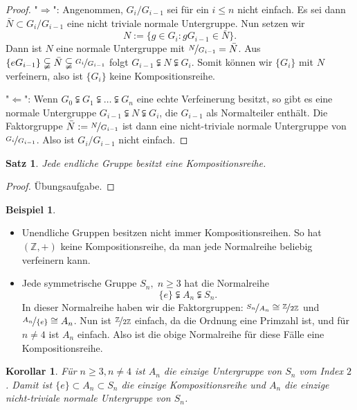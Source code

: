 \documentclass[12pt]{scrartcl} %
\newtheorem{thm}{Satz}
\newtheorem{kor}{Korollar}
\theoremstyle{definition}
\newtheorem{ex}{Beispiel}
\theoremstyle{remark}
\begin{document}
\begin{proof}
	"$\Rightarrow$": Angenommen, $G_i/G_{i-1}$ sei für ein $i\leq n$ nicht einfach. Es sei dann $\bar{N}\subset G_i/G_{i-1}$ eine nicht triviale normale Untergruppe. Nun setzen wir 
		\[N:=\{g\in G_i: gG_{i-1}\in\bar{N}\}.\]
	Dann ist $N$ eine normale Untergruppe mit $\nicefrac{N}{G_{i-1}}=\bar{N}$. Aus $\{eG_{i-1}\}\subsetneqq\bar{N}\subsetneqq\nicefrac{G_i}{G_{i-1}}$ folgt $G_{i-1}\subsetneqq N\subsetneqq G_i$. Somit können wir $\{G_i\}$ mit $N$ verfeinern, also ist $\{G_i\}$ keine Kompositionsreihe.
	
	"$\Leftarrow$": Wenn $G_0\subsetneqq G_1\subsetneqq\dots\subsetneqq G_n$ eine echte Verfeinerung besitzt, so gibt es eine normale Untergruppe $G_{i-1}\subsetneqq N\subsetneqq G_i$, die $G_{i-1}$ als Normalteiler enthält. Die Faktorgruppe $\bar{N}:=\nicefrac{N}{G_{i-1}}$ ist dann eine nicht-triviale normale Untergruppe von $\nicefrac{G_i}{G_{i-1}}$. Also ist $G_i/G_{i-1}$ nicht einfach.
\end{proof}

\begin{thm}
	Jede endliche Gruppe besitzt eine Kompositionsreihe.
\end{thm}

\begin{proof}
	Übungsaufgabe.
\end{proof}

\begin{ex}

	\begin{itemize}
		\item Unendliche Gruppen besitzen nicht immer Kompositionsreihen. So hat $(\mathbb{Z},+)$ keine Kompositionsreihe, da man jede Normalreihe beliebig verfeinern kann.
		\item Jede symmetrische Gruppe $S_n,\; n\geq 3$ hat die Normalreihe
			\[\{e\}\subsetneqq A_n \subsetneqq S_n.\]
			In dieser Normalreihe haben wir die Faktorgruppen: $\nicefrac{S_n}{A_n}\cong\nicefrac{\mathbb{Z}}{2\mathbb{Z}}$ und $\nicefrac{A_n}{\{e\}}\cong A_n$. Nun ist $\nicefrac{\mathbb{Z}}{2\mathbb{Z}}$ einfach, da die Ordnung eine Primzahl ist, und für $n\neq 4$ ist $A_n$ einfach. Also ist die obige Normalreihe für diese Fälle eine Kompositionsreihe.
	\end{itemize}
\end{ex}

\begin{kor}
	Für $n\geq 3,n\neq 4$ ist $A_n$ die einzige Untergruppe von $S_n$ vom Index $2$. Damit ist $\{e\}\subset A_n\subset S_n$ die einzige Kompositionsreihe und $A_n$ die einzige nicht-triviale normale Untergruppe von $S_n$.
\end{kor}
\end{document}
